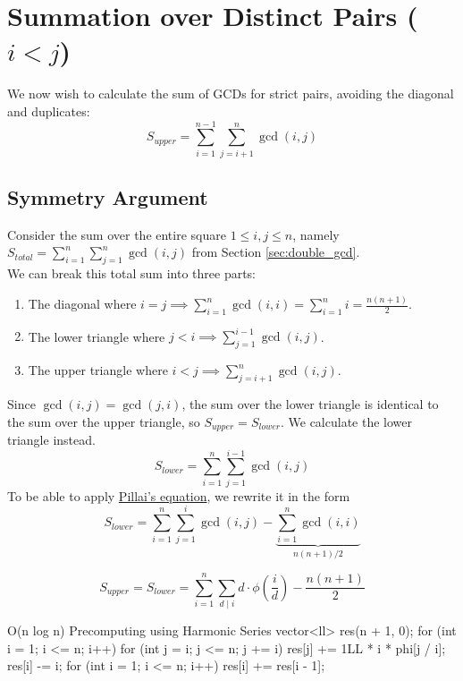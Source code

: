 \documentclass[11pt]{article}
\begin{document}
\section{Summation over Distinct Pairs \texorpdfstring{($i < j$)}{(i < j)}}
\label{sec:upper_triangular_gcd}

We now wish to calculate the sum of GCDs for strict pairs, avoiding the diagonal and duplicates:
\[ S_{upper} = \sum_{i=1}^{n-1} \sum_{j=i+1}^n \gcd(i, j) \]

\subsection{Symmetry Argument}

\begin{derivation}
    Consider the sum over the entire square $1 \le i, j \le n$, namely
$S_{total} = \sum_{i=1}^n \sum_{j=1}^n \gcd(i,j)$ from Section \ref{sec:double_gcd}. \\We can break this total sum into three parts:
    \begin{enumerate}
        \item The diagonal where $i = j \implies \sum_{i=1}^n \gcd(i,i) = \sum_{i=1}^n i = \frac{n(n+1)}{2}$.
        \item The lower triangle where $j < i\implies \sum_{j=1}^{i-1} \gcd(i,j)$.
        \item The upper triangle where $i < j\implies \sum_{j=i+1}^n \gcd(i,j)$.
    \end{enumerate}

    Since $\gcd(i, j) = \gcd(j, i)$, the sum over the lower triangle is identical to the sum over the upper triangle, so $S_{upper} = S_{lower}$. We calculate the lower triangle instead.
    \[ S_{lower} = \sum_{i=1}^n \sum_{j=1}^{i-1} \gcd(i,j) \]
    To be able to apply \hyperref[eq:pillai_result]{Pillai's equation}, we rewrite it in the form
    \[ S_{lower} = \sum_{i=1}^n \sum_{j=1}^{i} \gcd(i,j) - \underbrace{\sum_{i=1}^n \gcd(i,i)}_{n(n+1)/2} \]
\end{derivation}

\begin{resultbox}
    \begin{equation}
        S_{upper} = S_{lower} = \sum_{i=1}^n \sum_{d \mid i} d \cdot \phi\!\left(\frac{i}{d}\right) - \frac{n(n+1)}{2}
        \label{eq:strict_gcd_result}
    \end{equation}
\end{resultbox}

\begin{vscode}{O(n log n) Precomputing using Harmonic Series}
vector<ll> res(n + 1, 0);
for (int i = 1; i <= n; i++)
{
    for (int j = i; j <= n; j += i)
        res[j] += 1LL * i * phi[j / i];
    res[i] -= i;
}
for (int i = 1; i <= n; i++)
    res[i] += res[i - 1];
\end{vscode}
\end{document}
